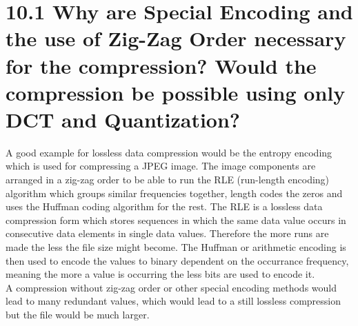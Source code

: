 \documentclass{article}
\begin{document}
	\pagestyle{fancy}
	
	\section*{10.1 Why are Special Encoding and the use of Zig-Zag Order necessary for the compression? Would the compression be possible using only DCT and Quantization?}
	\begin{adjustwidth}{2em}{2em}
		A good example for lossless data compression would be the entropy encoding which is used for compressing a JPEG image. The image components are arranged in a zig-zag order to be able to run the RLE (run-length encoding) algorithm which groups similar frequencies together, length codes the zeros and uses the Huffman coding algorithm for the rest. The RLE is a lossless data compression form which stores sequences in which the same data value occurs in consecutive data elements in single data values. Therefore the more runs are made the less the file size might become. The Huffman or arithmetic encoding is then used to encode the values to binary dependent on the occurrance frequency, meaning the more a value is occurring the less bits are used to encode it. \\
		A compression without zig-zag order or other special encoding methods would lead to many redundant values, which would lead to a still lossless compression but the file would be much larger.
	\end{adjustwidth}
	
\end{document}
